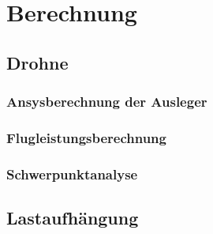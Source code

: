 \chapter{Berechnung}

\section{Drohne}
\subsection{Ansysberechnung der Ausleger}
\subsection{Flugleistungsberechnung}
\subsection{Schwerpunktanalyse}

\section{Lastaufhängung}
